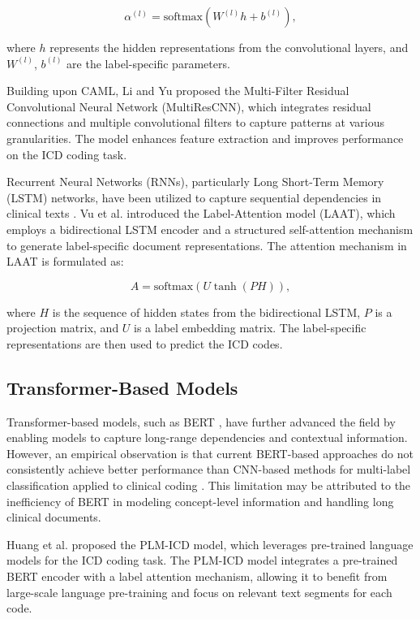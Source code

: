 \documentclass[12pt,a4paper]{report}
\begin{document}
\begin{equation}
\alpha^{(l)} = \text{softmax}(W^{(l)} h + b^{(l)}),
\end{equation}

where $h$ represents the hidden representations from the convolutional layers, and $W^{(l)}$, $b^{(l)}$ are the label-specific parameters.

Building upon CAML, Li and Yu \cite{li2020multi} proposed the Multi-Filter Residual Convolutional Neural Network (MultiResCNN), which integrates residual connections and multiple convolutional filters to capture patterns at various granularities. The model enhances feature extraction and improves performance on the ICD coding task.

Recurrent Neural Networks (RNNs), particularly Long Short-Term Memory (LSTM) networks, have been utilized to capture sequential dependencies in clinical texts \cite{hochreiter1997long}. Vu et al. \cite{vu2020label} introduced the Label-Attention model (LAAT), which employs a bidirectional LSTM encoder and a structured self-attention mechanism to generate label-specific document representations. The attention mechanism in LAAT is formulated as:

\begin{equation}
A = \text{softmax}(U \tanh(P H)),
\end{equation}

where $H$ is the sequence of hidden states from the bidirectional LSTM, $P$ is a projection matrix, and $U$ is a label embedding matrix. The label-specific representations are then used to predict the ICD codes.

\subsection{Transformer-Based Models}

Transformer-based models, such as BERT \cite{devlin2019bert}, have further advanced the field by enabling models to capture long-range dependencies and contextual information. However, an empirical observation is that current BERT-based approaches do not consistently achieve better performance than CNN-based methods for multi-label classification applied to clinical coding \cite{dong2022automated, gao2021limitations}. This limitation may be attributed to the inefficiency of BERT in modeling concept-level information and handling long clinical documents.

Huang et al. \cite{huang2022plm} proposed the PLM-ICD model, which leverages pre-trained language models for the ICD coding task. The PLM-ICD model integrates a pre-trained BERT encoder with a label attention mechanism, allowing it to benefit from large-scale language pre-training and focus on relevant text segments for each code.
\end{document}
